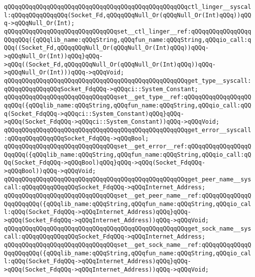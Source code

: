 \newline
\verb|qQQqqQQqqQQqqQQqqQQqqQQqqQQqqQQqqQQqqQQqqQQqqQQqqQQqctl_linger__syscall:qQQqqQQqqQQqqQQq(Socket_Fd,qQQqqQQqNull_Or(qQQqNull_Or(Int)qQQq))qQQq->qQQqNull_Or(Int);|\newline
\verb|qQQqqQQqqQQqqQQqqQQqqQQqqQQqqQQqset__ctl_linger__ref:qQQqqQQqqQQqqQQqqQQqqQQq({qQQqlib_name:qQQqString,qQQqfun_name:qQQqString,qQQqio_call:qQQq((Socket_Fd,qQQqqQQqNull_Or(qQQqNull_Or(Int)qQQq))qQQq->qQQqNull_Or(Int))qQQq}qQQq->qQQq((Socket_Fd,qQQqqQQqNull_Or(qQQqNull_Or(Int)qQQq))qQQq->qQQqNull_Or(Int)))qQQq->qQQqVoid;|\newline
\newline
\verb|qQQqqQQqqQQqqQQqqQQqqQQqqQQqqQQqqQQqqQQqqQQqqQQqqQQqget_type__syscall:qQQqqQQqqQQqqQQqSocket_FdqQQq->qQQqci::System_Constant;|\newline
\verb|qQQqqQQqqQQqqQQqqQQqqQQqqQQqqQQqset__get_type__ref:qQQqqQQqqQQqqQQqqQQqqQQq({qQQqlib_name:qQQqString,qQQqfun_name:qQQqString,qQQqio_call:qQQq(Socket_FdqQQq->qQQqci::System_Constant)qQQq}qQQq->qQQq(Socket_FdqQQq->qQQqci::System_Constant))qQQq->qQQqVoid;|\newline
\newline
\verb|qQQqqQQqqQQqqQQqqQQqqQQqqQQqqQQqqQQqqQQqqQQqqQQqqQQqget_error__syscall:qQQqqQQqqQQqqQQqSocket_FdqQQq->qQQqBool;|\newline
\verb|qQQqqQQqqQQqqQQqqQQqqQQqqQQqqQQqset__get_error__ref:qQQqqQQqqQQqqQQqqQQqqQQq({qQQqlib_name:qQQqString,qQQqfun_name:qQQqString,qQQqio_call:qQQq(Socket_FdqQQq->qQQqBool)qQQq}qQQq->qQQq(Socket_FdqQQq->qQQqBool))qQQq->qQQqVoid;|\newline
\newline
\verb|qQQqqQQqqQQqqQQqqQQqqQQqqQQqqQQqqQQqqQQqqQQqqQQqqQQqget_peer_name__syscall:qQQqqQQqqQQqqQQqSocket_FdqQQq->qQQqInternet_Address;|\newline
\verb|qQQqqQQqqQQqqQQqqQQqqQQqqQQqqQQqset__get_peer_name__ref:qQQqqQQqqQQqqQQqqQQqqQQq({qQQqlib_name:qQQqString,qQQqfun_name:qQQqString,qQQqio_call:qQQq(Socket_FdqQQq->qQQqInternet_Address)qQQq}qQQq->qQQq(Socket_FdqQQq->qQQqInternet_Address))qQQq->qQQqVoid;|\newline
\newline
\verb|qQQqqQQqqQQqqQQqqQQqqQQqqQQqqQQqqQQqqQQqqQQqqQQqqQQqget_sock_name__syscall:qQQqqQQqqQQqqQQqSocket_FdqQQq->qQQqInternet_Address;|\newline
\verb|qQQqqQQqqQQqqQQqqQQqqQQqqQQqqQQqset__get_sock_name__ref:qQQqqQQqqQQqqQQqqQQqqQQq({qQQqlib_name:qQQqString,qQQqfun_name:qQQqString,qQQqio_call:qQQq(Socket_FdqQQq->qQQqInternet_Address)qQQq}qQQq->qQQq(Socket_FdqQQq->qQQqInternet_Address))qQQq->qQQqVoid;|\newline
